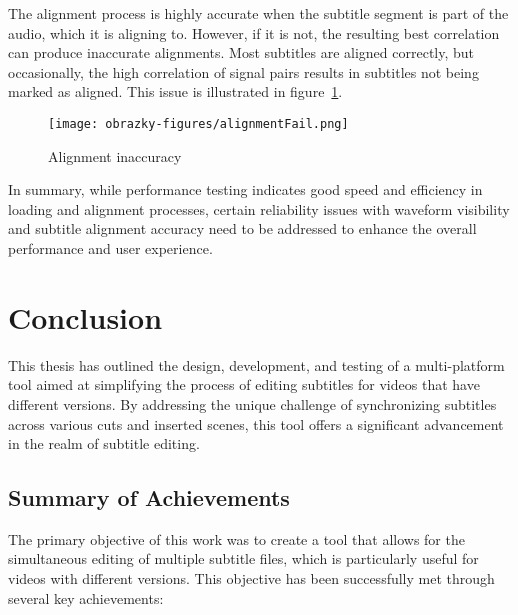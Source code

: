 The alignment process is highly accurate when the subtitle segment is part of the audio, which it is aligning to. However, if it is not, the resulting best correlation can produce inaccurate alignments. Most subtitles are aligned correctly, but occasionally, the high correlation of signal pairs results in subtitles not being marked as aligned. This issue is illustrated in figure~\ref{fig:alignmentFail}.

\begin{figure}[ht]
\centering
\texttt{[image: obrazky-figures/alignmentFail.png]}
\caption{Alignment inaccuracy}
\label{fig:alignmentFail}
\end{figure}

In summary, while performance testing indicates good speed and efficiency in loading and alignment processes, certain reliability issues with waveform visibility and subtitle alignment accuracy need to be addressed to enhance the overall performance and user experience.

\chapter{Conclusion}

This thesis has outlined the design, development, and testing of a multi-platform tool aimed at simplifying the process of editing subtitles for videos that have different versions. By addressing the unique challenge of synchronizing subtitles across various cuts and inserted scenes, this tool offers a significant advancement in the realm of subtitle editing.

\section{Summary of Achievements}

The primary objective of this work was to create a tool that allows for the simultaneous editing of multiple subtitle files, which is particularly useful for videos with different versions. This objective has been successfully met through several key achievements:

